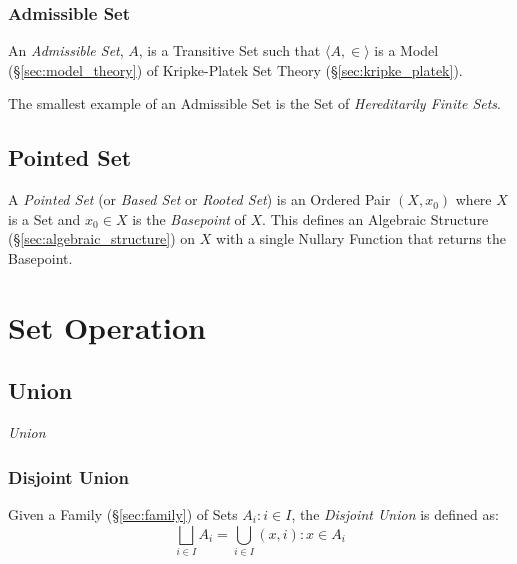 \subsubsection{Admissible Set}\label{sec:admissible_set}

An \emph{Admissible Set}, $A$, is a Transitive Set such that $\langle
A, \in \rangle$ is a Model (\S\ref{sec:model_theory}) of Kripke-Platek
Set Theory (\S\ref{sec:kripke_platek}).

The smallest example of an Admissible Set is the Set of
\emph{Hereditarily Finite Sets}. %



\subsection{Pointed Set}\label{sec:pointed_set}

A \emph{Pointed Set} (or \emph{Based Set} or \emph{Rooted Set}) is an
Ordered Pair $(X, x_0)$ where $X$ is a Set and $x_0 \in X$ is the
\emph{Basepoint} of $X$. This defines an Algebraic Structure
(\S\ref{sec:algebraic_structure}) on $X$ with a single Nullary
Function that returns the Basepoint.



\section{Set Operation}\label{sec:set_operation}

\subsection{Union}\label{sec:union}

\emph{Union}



\subsubsection{Disjoint Union}\label{sec:disjoint_union}

Given a Family (\S\ref{sec:family}) of Sets ${A_i : i \in I}$,
the \emph{Disjoint Union} is defined as:
\[
  \bigsqcup_{i \in I} A_i = \bigcup_{i \in I} {(x,i) : x \in A_i}
\]



